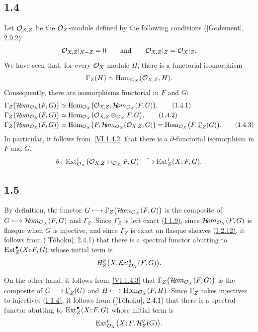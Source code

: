 \subsection*{1.4}
Let $\mathcal O_{X,Z}$ be the $\mathcal O_X$-module defined by the following conditions
\textup{([Godement], 2.9.2)}:
\[
 \mathcal O_{X,Z}|_{X-Z}=0
 \qquad\text{and}\qquad
 \mathcal O_{X,Z}|_Z=\mathcal O_X|_Z.
\]
We have seen that, for every $\mathcal O_X$-module $H$, there is a functorial
isomorphism
\[
 \Gamma_Z(H)\simeq \operatorname{Hom}_{\mathcal O_X}(\mathcal O_{X,Z},H).
\]
Consequently, there are isomorphisms functorial in $F$ and $G$:
\begin{align}
 \Gamma_Z\bigl(\mathcal H\!om_{\mathcal O_X}(F,G)\bigr)
  &\simeq \operatorname{Hom}_{\mathcal O_X}\bigl(\mathcal O_{X,Z},\mathcal H\!om_{\mathcal O_X}(F,G)\bigr),
   \tag{1.4.1}\label{VI.1.4.1}\\[-0.15em]
 \Gamma_Z\bigl(\mathcal H\!om_{\mathcal O_X}(F,G)\bigr)
  &\simeq \operatorname{Hom}_{\mathcal O_X}\bigl(\mathcal O_{X,Z}\otimes_{\mathcal O_X}F,G\bigr),
   \tag{1.4.2}\label{VI.1.4.2}\\[-0.15em]
 \Gamma_Z\bigl(\mathcal H\!om_{\mathcal O_X}(F,G)\bigr)
  &\simeq \operatorname{Hom}_{\mathcal O_X}\bigl(F,\mathcal H\!om_{\mathcal O_X}(\mathcal O_{X,Z},G)\bigr)
   =\operatorname{Hom}_{\mathcal O_X}\bigl(F,\underline{\Gamma}_Z(G)\bigr).
   \tag{1.4.3}\label{VI.1.4.3}
\end{align}
In particular, it follows from~\eqref{VI.1.4.2} that there is a
$\partial$-functorial isomorphism in $F$ and $G$,
\[
 \theta\colon
 \operatorname{Ext}_{\mathcal O_X}^{i}\bigl(\mathcal O_{X,Z}\otimes_{\mathcal O_X}F,G\bigr)
 \xrightarrow{\ \sim\ }
 \operatorname{Ext}_Z^{i}(X;F,G).
\]

\subsection*{1.5}
By definition, the functor
$G\longmapsto\Gamma_Z\bigl(\mathcal H\!om_{\mathcal O_X}(F,G)\bigr)$ is the composite of
$G\longmapsto\mathcal H\!om_{\mathcal O_X}(F,G)$ and $\Gamma_Z$. Since $\Gamma_Z$ is left
exact \textup{(\hyperref[I.1.9]{I 1.9)}}, since $\mathcal H\!om_{\mathcal O_X}(F,G)$ is flasque when $G$ is
injective, and since $\Gamma_Z$ is exact on flasque sheaves \textup{(\hyperref[I.2.12]{I 2.12)}},
it follows from \textup{([T\^ohoku], 2.4.1)} that there is a spectral functor
abutting to $\operatorname{Ext}_Z^{\bullet}(X;F,G)$ whose initial term is
\[
 H_Z^p\bigl(X,\mathcal E\!xt_{\mathcal O_X}^q(F,G)\bigr).
\]

On the other hand, it follows from~\eqref{VI.1.4.3} that
$\Gamma_Z\bigl(\mathcal H\!om_{\mathcal O_X}(F,G)\bigr)$ is the composite of
$G\longmapsto\underline{\Gamma}_Z(G)$ and
$H\longmapsto\operatorname{Hom}_{\mathcal O_X}(F,H)$. Since $\underline{\Gamma}_Z$ takes injectives to
injectives \textup{(\hyperref[I.1.4]{I 1.4)}}, it follows from \textup{([T\^ohoku], 2.4.1)}
that there is a spectral functor abutting to $\operatorname{Ext}_Z^{\bullet}(X;F,G)$ whose
initial term is
\[
 \operatorname{Ext}_{\mathcal O_X}^p\bigl(X;F,\mathcal H_Z^q(G)\bigr).
\]

